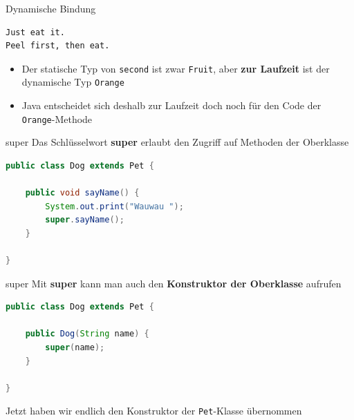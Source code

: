 \documentclass[18pt]{beamer}
\begin{document}
\begin{frame}[fragile]{Dynamische Bindung}
    \begin{exampleblock}{}
        \begin{lstlisting}
Just eat it.
Peel first, then eat.
        \end{lstlisting}
    \end{exampleblock}

    \begin{itemize}
        \item Der statische Typ von \texttt{second} ist zwar \texttt{Fruit}, aber \textbf{zur Laufzeit} ist der \alert{dynamische Typ} \texttt{Orange}
        \item Java entscheidet sich deshalb zur Laufzeit doch noch für den Code der \texttt{Orange}-Methode
    \end{itemize}

\end{frame}



\begin{frame}[fragile]{super}
    Das Schlüsselwort \textbf{super} erlaubt den Zugriff auf Methoden der Oberklasse

    \begin{exampleblock}{}
        \begin{lstlisting}[language=Java]
public class Dog extends Pet {

    public void sayName() {
        System.out.print("Wauwau ");
        super.sayName();
    }

}
        \end{lstlisting}

    \end{exampleblock}

\end{frame}

\begin{frame}[fragile]{super}
    Mit \textbf{super} kann man auch den \textbf{Konstruktor der Oberklasse} aufrufen

    \begin{exampleblock}{}
        \begin{lstlisting}[language=Java]
public class Dog extends Pet {

    public Dog(String name) {
        super(name);
    }

}
        \end{lstlisting}

    \end{exampleblock}
    \vspace{.2in}
    Jetzt haben wir endlich den Konstruktor der \texttt{Pet}-Klasse übernommen
\end{frame}
\end{document}
